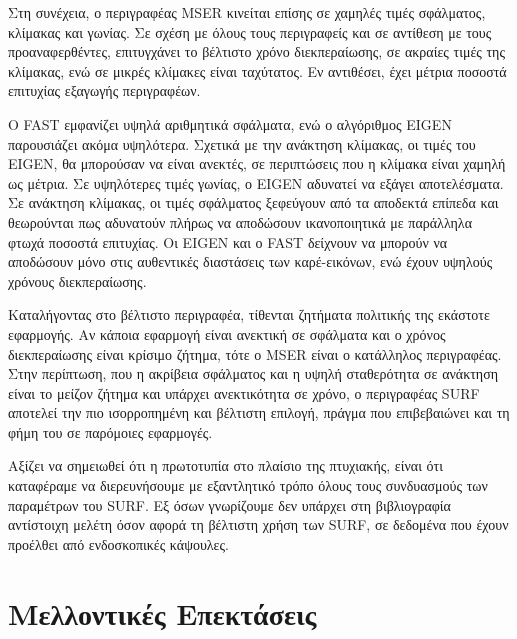 Στη συνέχεια, ο περιγραφέας MSER κινείται επίσης σε χαμηλές τιμές σφάλματος, κλίμακας και γωνίας. Σε σχέση με όλους τους περιγραφείς και σε αντίθεση με τους προαναφερθέντες, επιτυγχάνει το βέλτιστο χρόνο διεκπεραίωσης, 
σε ακραίες τιμές της κλίμακας, ενώ σε μικρές κλίμακες είναι ταχύτατος. Εν αντιθέσει, έχει μέτρια ποσοστά επιτυχίας εξαγωγής περιγραφέων.

Ο FAST εμφανίζει υψηλά αριθμητικά σφάλματα, ενώ ο αλγόριθμος EIGEN παρουσιάζει ακόμα υψηλότερα. Σχετικά με την ανάκτηση κλίμακας, οι τιμές του EIGEN, θα μπορούσαν να είναι ανεκτές, σε περιπτώσεις που η κλίμακα είναι χαμηλή ως μέτρια. Σε υψηλότερες τιμές 
γωνίας, ο EIGEN αδυνατεί να εξάγει αποτελέσματα. Σε ανάκτηση κλίμακας, οι τιμές σφάλματος ξεφεύγουν από τα αποδεκτά επίπεδα και θεωρούνται πως αδυνατούν πλήρως να αποδώσουν ικανοποιητικά με παράλληλα φτωχά ποσοστά επιτυχίας.
Οι EIGEN και ο FAST δείχνουν να μπορούν να αποδώσουν μόνο στις αυθεντικές διαστάσεις των καρέ-εικόνων, ενώ έχουν υψηλούς χρόνους διεκπεραίωσης.\par


Καταλήγοντας στο βέλτιστο περιγραφέα, τίθενται ζητήματα πολιτικής της εκάστοτε εφαρμογής. Αν κάποια εφαρμογή είναι ανεκτική σε σφάλματα και ο χρόνος διεκπεραίωσης είναι κρίσιμο ζήτημα, 
τότε ο MSER είναι ο κατάλληλος περιγραφέας.
Στην περίπτωση, που η ακρίβεια σφάλματος και η υψηλή σταθερότητα σε ανάκτηση είναι το μείζον ζήτημα και υπάρχει ανεκτικότητα σε χρόνο, ο περιγραφέας SURF αποτελεί την πιο ισορροπημένη και βέλτιστη επιλογή, 
πράγμα που επιβεβαιώνει και τη φήμη του σε παρόμοιες εφαρμογές. \par

Αξίζει να σημειωθεί ότι η πρωτοτυπία στο πλαίσιο της πτυχιακής, είναι ότι καταφέραμε να διερευνήσουμε με εξαντλητικό τρόπο όλους τους συνδυασμούς των παραμέτρων του SURF. Εξ όσων γνωρίζουμε δεν υπάρχει στη βιβλιογραφία 
αντίστοιχη μελέτη όσον αφορά τη βέλτιστη χρήση των SURF, σε δεδομένα που έχουν προέλθει από ενδοσκοπικές κάψουλες.



\section{Μελλοντικές Επεκτάσεις}

